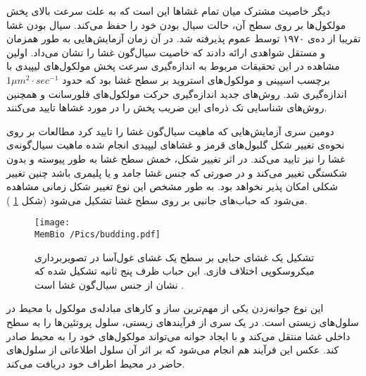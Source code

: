 
دیگر خاصیت مشترک میان تمام غشا‌ها این است که به علت سرعت بالای پخش مولکول‌ها بر روی سطح آن، حالت سیال بودن خود را حفظ می‌کند. سیال بودن غشا تقریبا از ده‌ی ۱۹۷۰ توسط عموم پذیرفته شد. در آن زمان آزمایش‌هایی به طور همزمان و مستقل شواهدی ارائه دادند که خاصیت سیال‌گون غشا را نشان می‌داد. اولین مشاهده در این تحقیقات مربوط به اندازه‌گیری سرعت پخش مولکول‌های لیپیدی  با برچسب اسپینی
\cite{Kornberg1971DiffusionPhospholipids, Devaux1972LateralDiffusion}
و مولکول‌های استروید  
\cite{Sackmann1972, Traeubl1972}
بر سطح غشا بود که حدود 
$1 \mu m^2\cdot sec^{-1}$
اندازه‌گیری شد. روش‌های جدید اندازه‌گیری  حرکت مولکول‌های فلورسانت  
\cite{almeida1992lateral}
و همچنین روش‌های شناسایی تک ذره‌ای  
\cite{Sako1994, Saxton1997, Fujiwara2002, Kusumi2005}
این ضریب پخش را در مورد غشاها تایید می‌کنند.

دومین سری آزمایش‌هایی که ماهیت سیال‌گون غشا را تایید کرد  مطالعات بر روی نحوه‌ی تغییر شکل گلبول‌های قرمز 
\cite{Canham1970, Evans1974}
و غشاهای لیپیدی
\cite{Helfrich1973, Helfrich1976}
انجام شده ماهیت سیال‌گونه‌ی غشا را نیز تایید می‌کند. در اثر تغییر شکل، خمش سطح غشا  به طور پیوسته و بدون شکستگی تغییر می‌کند و در صورتی که جنس غشا جامد و یا پلیمری باشد چنین تغییر شکلی امکان پذیر نخواهد بود. به طور مشخص این نوع تغییر شکل زمانی مشاهده می‌شود که حباب‌های جانبی بر روی سطح غشا تشکیل می‌شود (شکل 
\ref{fig:budding}
).

\begin{figure}[t]
\begin{center}
\texttt{[image: \\MemBio /Pics/budding.pdf]}
\caption{
تشکیل یک غشای حبابی بر سطح یک غشای غول‌آسا در تصویربرداری میکروسکوپی اختلاف فازی. این حباب ظرف پنج ثانیه تشکیل  شده که نشان از جنس سیال‌گون غشا است
\cite{Dimova2006}.
}
\label{fig:budding}
\end{center}
\end{figure}

این نوع جوانه‌زدن  
یکی از مهم‌ترین ساز‌ و کار‌های مبادله‌ی مولکول با محیط در سلول‌های زیستی‌ است. در یک سری از فرآیند‌های زیستی، سلول پروتئین‌ها را به سطح داخلی غشا منتقل می‌کند و با ایجاد جوانه می‌تواند مولکول‌های خود را به محیط صادر کند. عکس این فرآیند هم انجام می‌شود که بر اثر آن سلول اطلاعاتی از سلول‌های حاضر در محیط اطراف خود دریافت می‌کند.






